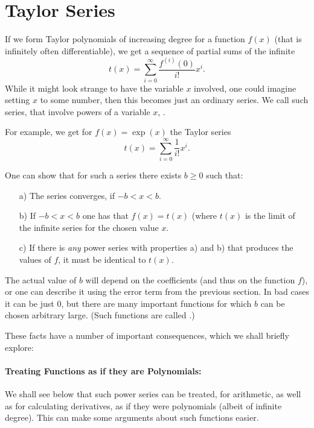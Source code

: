 \section{Taylor Series}
\label{sectaylors}

If we form Taylor polynomials of increasing degree for a function $f(x)$
(that is infinitely often differentiable),
we get a sequence of partial sums of the infinite
\[
t(x)=\sum_{i=0}^\infty\frac{f^{(i)}(0)}{i!} x^i.
\]
While it might look strange to have the variable $x$ involved, one could
imagine setting $x$ to some number, then this becomes just an ordinary
series. We call such series, that involve powers of a variable $x$,
.

For example, we get for $f(x)=\exp(x)$ the Taylor series
\[
t(x)=\sum_{i=0}^\infty\frac{1}{i!} x^i.
\]

One can show that for such a series there exists $b\ge 0$ such that:
\begin{itemize}
\item[a)]
The
series converges, if $-b<x<b$.
\item[b)]
If $-b<x<b$ one has that $f(x)=t(x)$ (where $t(x)$ is the limit of the
infinite series for the chosen value $x$.
\item[c)] If there is {\em any} power series with properties a) and b) that
produces the values of $f$, it must be identical to $t(x)$.
\end{itemize}
The actual value of $b$ will depend on the
coefficients (and thus on the function $f$), or one can describe it using
the error term from the previous section.
In bad cases it can be just $0$, but there are many important functions for
which $b$ can be chosen arbitrary large. (Such functions are called
.)
\medskip

These facts have a number of important consequences, which we shall briefly
explore:
\paragraph{Treating Functions as if they are Polynomials:}
We shall see below that such power series can be treated, for arithmetic, as
well as for calculating derivatives, as if they were polynomials (albeit of
infinite degree). This can make some arguments about such functions easier.

